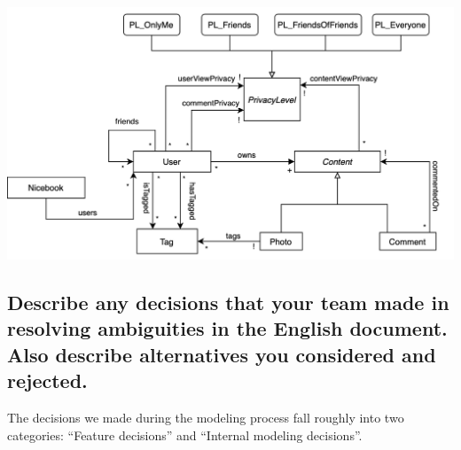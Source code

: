 \documentclass[titlepage]{article}
\begin{document}
\includegraphics[width=6in]{images/true_model.png}

\subsection{Describe any decisions that your team made in resolving ambiguities in the English document. Also describe alternatives you considered and rejected.}

The decisions we made during the modeling process fall roughly into two categories: “Feature decisions” and “Internal modeling decisions”.
\end{document}
